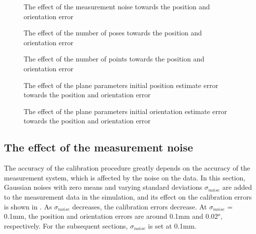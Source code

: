 \begin{figure}[t]
  \centering
  \caption{The effect of the measurement noise towards the position and orientation error} 
  \label{fig:laser_noise}
\end{figure}


\begin{figure}[t]
  \centering
  \caption{The effect of the number of poses towards the position and orientation error} 
  \label{fig:num_of_poses}
\end{figure}


\begin{figure}[t]
  \centering
  \caption{The effect of the number of points towards the position and orientation error} 
  \label{fig:num_of_points}
\end{figure}

\begin{figure}[t]
  \centering
  \caption{The effect of the plane parameters initial position estimate error towards the position and orientation error} 
  \label{fig:plane_params_linear}
\end{figure}

\begin{figure}[t]
  \centering
  \caption{The effect of the plane parameters initial orientation estimate error towards the position and orientation error} 
  \label{fig:plane_params_angular}
\end{figure}




\subsection{The effect of the measurement noise}
\label{sec:meas_accuracy}
The accuracy of the calibration procedure greatly depends on the accuracy of the measurement system, which is affected by the noise on the data. In this section, Gaussian noises with zero means and varying standard deviations $\sigma_{noise}$ are added to the measurement data in the simulation, and its effect on the calibration errors is shown in . As $\sigma_{noise}$ decreases, the calibration errors decrease. At $\sigma_{noise}$ = 0.1mm, the position and orientation errors are around 0.1mm and 0.02$^o$, respectively. For the subsequent sections, $\sigma_{noise}$ is set at 0.1mm. 

